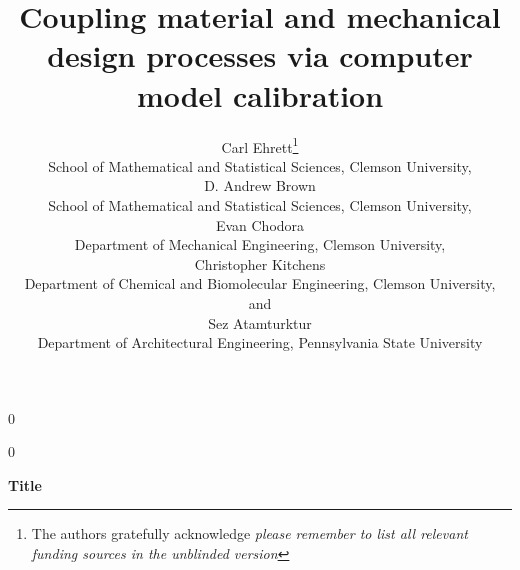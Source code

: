 \documentclass[12pt]{article}
\newcommand{\blind}{0}
\begin{document}
%

\def\spacingset#1{\renewcommand{\baselinestretch}%
{#1}\small\normalsize} \spacingset{1}



\blind
{
  \title{\bf Coupling material and mechanical design processes via computer model calibration}
  \author{Carl Ehrett\thanks{
    The authors gratefully acknowledge \textit{please remember to list all relevant funding sources in the unblinded version}}\hspace{.2cm}\\
    School of Mathematical and Statistical Sciences, Clemson University,\\
    D. Andrew Brown \\
    School of Mathematical and Statistical Sciences, Clemson University,\\
    Evan Chodora \\
    Department of Mechanical Engineering, Clemson University,\\
    Christopher Kitchens \\
    Department of Chemical and Biomolecular Engineering, Clemson University,\\
    and \\
    Sez Atamturktur \\
    Department of Architectural Engineering, Pennsylvania State University\\}
  \maketitle
} \fi

\blind
{
  \bigskip
  \bigskip
  \bigskip
  \begin{center}
    {\LARGE\bf Title}
\end{center}
  \medskip
} \fi
\end{document}
